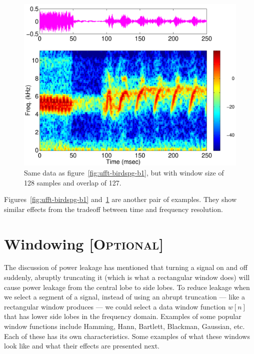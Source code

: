 \begin{figure}[p]
\centerline{\includegraphics[height=0.4\textheight]{ch-fft/ufft_bluewing1am_spg128_127}}
\caption[Same data as figure~\protect\ref{fig:ufft-birdspg-b1}; 128
sample window, overlap 127]{Same data as
figure~\protect\ref{fig:ufft-birdspg-b1}, but with window size of 128
samples and overlap of 127.\label{fig:ufft-birdspg-b2}}
\end{figure}

Figures~\ref{fig:ufft-birdspg-b1} and~\ref{fig:ufft-birdspg-b2} are
another pair of examples. They show similar effects from the tradeoff
between time and frequency resolution.

\section{Windowing [\textsc{Optional}]}

The discussion of power leakage has mentioned that turning a signal
on and off suddenly, abruptly truncating it (which is what a
rectangular window does) will cause power leakage from the central
lobe to side lobes. To reduce leakage when we select a segment of a
signal, instead of using an abrupt truncation --- like a rectangular
window produces --- we could select a data window function $w[n]$ that
has lower side lobes in the frequency domain. Examples of some popular
window functions include Hamming, Hann, Bartlett, Blackman, Gaussian,
etc. Each of these has its own characteristics. Some
examples of what these windows look like and what their effects are
presented next.

